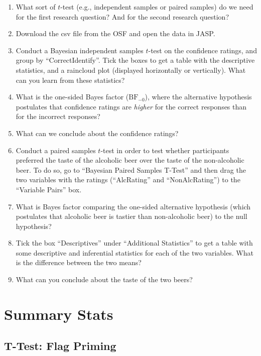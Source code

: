 \documentclass[
]{book}
\providecommand{\tightlist}{%
  \setlength{\itemsep}{0pt}\setlength{\parskip}{0pt}}
\begin{document}
\begin{enumerate}
\def\labelenumi{\arabic{enumi}.}
\tightlist
\item
  What sort of \(t\)-test (e.g., independent samples or paired samples) do we need for the first research question? And for the second research question?
\item
  Download the csv file from the OSF and open the data in JASP.
\item
  Conduct a Bayesian independent samples \(t\)-test on the confidence ratings, and group by ``CorrectIdentify''. Tick the boxes to get a table with the descriptive statistics, and a raincloud plot (displayed horizontally or vertically). What can you learn from these statistics?
\item
  What is the one-sided Bayes factor (\(\text{BF}_{-0}\)), where the alternative hypothesis postulates that confidence ratings are \emph{higher} for the correct responses than for the incorrect responses?
\item
  What can we conclude about the confidence ratings?
\item
  Conduct a paired samples \(t\)-test in order to test whether participants preferred the taste of the alcoholic beer over the taste of the non-alcoholic beer. To do so, go to ``Bayesian Paired Samples T-Test'' and then drag the two variables with the ratings (``AlcRating'' and ``NonAlcRating'') to the ``Variable Pairs'' box.
\item
  What is Bayes factor comparing the one-sided alternative hypothesis (which postulates that alcoholic beer is tastier than non-alcoholic beer) to the null hypothesis?
\item
  Tick the box ``Descriptives'' under ``Additional Statistics'' to get a table with some descriptive and inferential statistics for each of the two variables. What is the difference between the two means?
\item
  What can you conclude about the taste of the two beers?
\end{enumerate}

\hypertarget{summary-stats}{%
\section{Summary Stats}\label{summary-stats}}

\hypertarget{t-test-flag-priming}{%
\subsection{T-Test: Flag Priming}\label{t-test-flag-priming}}
\end{document}
